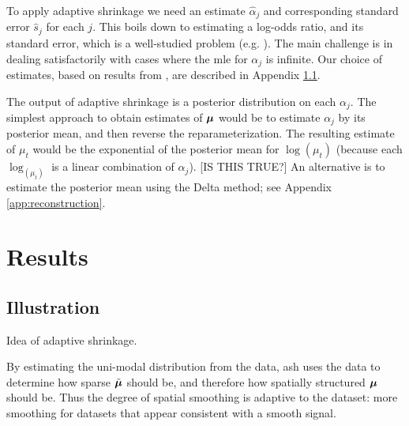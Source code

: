 \documentclass[12pt]{article}
\begin{document}
To apply adaptive shrinkage we need an estimate $\hat{\alpha}_{j}$ and corresponding standard error $\hat{s}_j$
for each $j$. This boils down to estimating a log-odds ratio, and its standard error, which is a well-studied problem
(e.g. \cite{Gart1967Bias}). The main challenge is in dealing satisfactorily with cases where the mle for $\alpha_j$ is infinite. Our choice of estimates, based on results from \cite{Gart1967Bias}, are described in Appendix \ref{}.

The output of adaptive shrinkage is a posterior distribution on each $\alpha_j$. The simplest approach
to obtain estimates of $\bm{\mu}$  would be to estimate
$\alpha_j$ by its posterior mean, and then reverse the reparameterization. 
The resulting estimate of $\mu_t$ would be the exponential of the posterior
mean for $\log(\mu_t)$ (because each $\log_(\mu_t)$ is a linear combination of $\alpha_j$). [IS THIS TRUE?]
An alternative is to estimate the posterior mean using the Delta method; see Appendix \ref{app:reconstruction}.




 




\section{Results}

\subsection{Illustration}

Idea of adaptive shrinkage.

By estimating the uni-modal distribution from the data, ash uses the data to
determine how sparse $\tilde{\bm{\mu}}$ should be,
and therefore how spatially structured $\bm{\mu}$ should be. Thus the degree of spatial smoothing is adaptive to the dataset: more smoothing for
datasets that appear consistent with a smooth signal.
\end{document}
